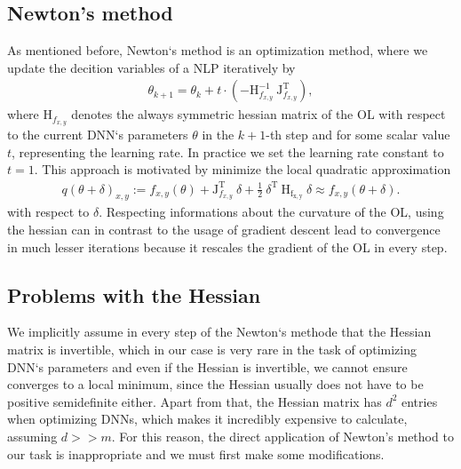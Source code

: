 \documentclass[conference]{IEEEtran}
\begin{document}
\subsection{Newton's method}\label{AA}
As mentioned before, Newton`s method is an optimization method, where we update the decition variables of a NLP iteratively by
\begin{align}
 \theta_{k+1} = \theta_{k} + t\cdot (-\mathrm{H}_{f_{x, y}}^{-1}\:\mathrm{J}_{f_{x, y}}^{\mathrm{T}}),
\end{align}
where $\mathrm{H}_{f_{x, y}}$ denotes the always symmetric hessian matrix of the OL with respect to the current DNN`s parameters $\theta$ in the $k+1$-th step and for some scalar value $t$, representing the learning rate. In practice we set the learning rate constant to $t=1$. This approach is motivated by minimize the local quadratic approximation
\begin{align}
q(\theta + \delta)_{x, y} := f_{x, y}(\theta) + \mathrm{J}_{f_{x, y}}^{\mathrm{T}}\:\delta + \frac{1}{2}\:\delta^{\mathrm{T}}\:\mathrm{H_{f_{x, y}}}\:\delta \approx f_{x, y}(\theta + \delta).
\end{align}
with respect to $\delta$. 
Respecting informations about the curvature of the OL, using the hessian can in contrast to the usage of gradient descent lead to convergence in much lesser iterations because it rescales the gradient of the OL in every step.

\subsection{Problems with the Hessian}
We implicitly assume in every step of the Newton`s methode that the Hessian matrix is invertible, which in our case is very rare in the task of optimizing DNN`s parameters and even if the Hessian is invertible, we cannot ensure converges to a local minimum, since the Hessian usually does not have to be positive semidefinite either. Apart from that, the Hessian matrix has $d^{2}$ entries when optimizing DNNs, which makes it incredibly expensive to calculate, assuming $d>>m$. For this reason, the direct application of Newton's method to our task is inappropriate and we must first make some modifications.
\end{document}
